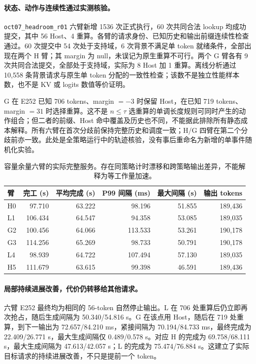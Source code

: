 \documentclass[UTF8,fontset=fandol,a4paper,10pt]{ctexart}
\newcommand{\code}[1]{\nolinkurl{#1}}
\begin{document}
\paragraph{状态、动作与连续性通过实测核验。}
\code{oct07_headroom_r01} 六臂新增 1536 次正式执行，60 次共同合法 lookup 均成功提交，其中 56 Host、4 重算。各臂的请求身份、已知历史和输出前缀连续性检查通过。60 次提交中 54 次处于支持域，6 次背景不满足单 token 就绪条件，全部出现在两个 H 臂；其 margin 为 null，未误记为原生重算不可行。两个 G 臂各有 9 次共同合法提交，全部处于支持域，实际为 8 Host 加 1 重算。离线分析通过 10,558 条背景请求与原生单 token 分配的一致性检查；该数不是独立性能样本数，也不是 KV 或 logits 数值等价证明。

G 在 E252 已知 706 tokens、margin $=-3$ 时保留 Host，在已知 719 tokens、margin $=31$ 时选择重算。这不是 $n\le\tau$ 选重算的单调长度规则可同时产生的动作组合；但二者的前缀、Host 命中覆盖及历史也不同，不能据此排除所有静态成本解释。所有六臂在首次分歧前保持完整历史和调度一致；H/G 四臂在第二个分歧前亦一致。此处是全策略运行中的轨迹核验，没有事后重命名为新增的单事件随机化实验。

\begin{table}[htbp]
\centering\small
\caption{容量余量六臂的实际完整服务。存在同策略计时漂移和跨策略输出差异，不能解释为等工作量加速。}
\begin{tabular}{lrrrrr}
\toprule
臂 & 完工 (s) & 平均完成 (s) & P99 间隔 (ms) & 最大间隔 (s) & 输出 tokens\\
\midrule
H0 & 97.710 & 63.222 & 98.196 & 51.855 & 189,436\\
L1 & 106.434 & 64.547 & 94.358 & 53.085 & 189,035\\
G2 & 100.456 & 64.066 & 113.533 & 53.261 & 190,178\\
G3 & 114.256 & 65.269 & 98.733 & 50.791 & 190,178\\
L4 & 98.939 & 64.722 & 107.494 & 57.130 & 189,035\\
H5 & 111.679 & 63.615 & 99.398 & 46.591 & 189,436\\
\bottomrule
\end{tabular}
\end{table}

\paragraph{局部持续进展改善，代价仍转移给其他请求。}
六臂 E252 最终均为相同的 56-token 自然停止输出。L 在 706 处重算后仍立即再次抢占，随后生成间隔为 50.340/54.816 s。G 在该点用 Host，随后在 719 处重算，到下一输出为 72.657/84.210 ms，紧接间隔为 70.194/84.733 ms，最终完成为 22.409/26.771 s，最大生成间隔仅 0.489/0.578 s。对应 H 的完成为 69.758/68.111 s，最大生成间隔为 47.613/42.057 s；L 的完成为 75.474/76.884 s。这建立了实际目标请求的持续进展改善，不只是提前一个 token。
\end{document}
